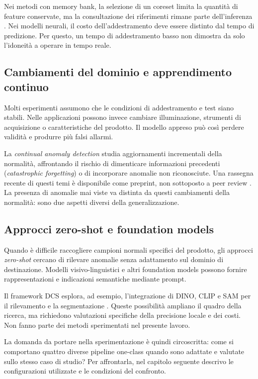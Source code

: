 Nei metodi con memory bank, la selezione di un coreset limita la quantità di feature conservate, ma la consultazione dei riferimenti rimane parte dell'inferenza \cite{Roth_et_al._2022}. Nei modelli neurali, il costo dell'addestramento deve essere distinto dal tempo di predizione. Per questo, un tempo di addestramento basso non dimostra da solo l'idoneità a operare in tempo reale.

\subsection{Cambiamenti del dominio e apprendimento continuo}

Molti esperimenti assumono che le condizioni di addestramento e test siano stabili. Nelle applicazioni possono invece cambiare illuminazione, strumenti di acquisizione o caratteristiche del prodotto. Il modello appreso può così perdere validità e produrre più falsi allarmi.

La \textit{continual anomaly detection} studia aggiornamenti incrementali della normalità, affrontando il rischio di dimenticare informazioni precedenti (\textit{catastrophic forgetting}) o di incorporare anomalie non riconosciute. Una rassegna recente di questi temi è disponibile come preprint, non sottoposto a peer review \cite{Faber_et_al._2026}. La presenza di anomalie mai viste va distinta da questi cambiamenti della normalità: sono due aspetti diversi della generalizzazione.

\subsection{Approcci zero-shot e foundation models}

Quando è difficile raccogliere campioni normali specifici del prodotto, gli approcci \textit{zero-shot} cercano di rilevare anomalie senza adattamento sul dominio di destinazione. Modelli visivo-linguistici e altri foundation models possono fornire rappresentazioni e indicazioni semantiche mediante prompt.

Il framework DCS esplora, ad esempio, l'integrazione di DINO, CLIP e SAM per il rilevamento e la segmentazione \cite{Wan_et_al._2026}. Queste possibilità ampliano il quadro della ricerca, ma richiedono valutazioni specifiche della precisione locale e dei costi. Non fanno parte dei metodi sperimentati nel presente lavoro.

La domanda da portare nella sperimentazione è quindi circoscritta: come si comportano quattro diverse pipeline one-class quando sono adattate e valutate sullo stesso caso di studio? Per affrontarla, nel capitolo seguente descrivo le configurazioni utilizzate e le condizioni del confronto.
